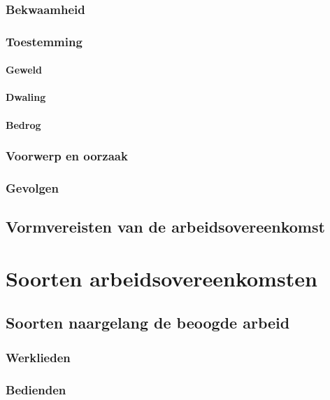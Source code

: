 \subsubsection{Bekwaamheid}

\subsubsection{Toestemming}

\paragraph{Geweld}

\paragraph{Dwaling}

\paragraph{Bedrog}

\subsubsection{Voorwerp en oorzaak}

\subsubsection{Gevolgen}

\subsection{Vormvereisten van de arbeidsovereenkomst}

\section{Soorten arbeidsovereenkomsten}

\subsection{Soorten naargelang de beoogde arbeid}

\subsubsection{Werklieden}

\subsubsection{Bedienden}

